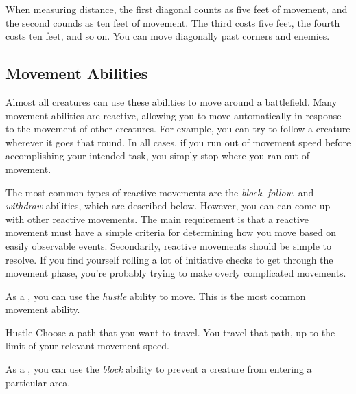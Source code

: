         \label{Diagonals} When measuring distance, the first diagonal counts as five feet of movement, and the second counds as ten feet of movement.
        The third costs five feet, the fourth costs ten feet, and so on.
        You can move diagonally past corners and enemies.

    \subsection{Movement Abilities}\label{Movement Abilities}

        Almost all creatures can use these abilities to move around a battlefield.
        Many movement abilities are reactive, allowing you to move automatically in response to the movement of other creatures.
        For example, you can try to follow a creature wherever it goes that round.
        In all cases, if you run out of movement speed before accomplishing your intended task, you simply stop where you ran out of movement.

        The most common types of reactive movements are the \textit{block}, \textit{follow}, and \textit{withdraw} abilities, which are described below.
        However, you can can come up with other reactive movements.
        The main requirement is that a reactive movement must have a simple criteria for determining how you move based on easily observable events.
        Secondarily, reactive movements should be simple to resolve.
        If you find yourself rolling a lot of initiative checks to get through the movement phase, you're probably trying to make overly complicated movements.

        \label{Hustle} As a , you can use the \textit{hustle} ability to move.
        This is the most common movement ability.

        \begin{activeability}{Hustle}
            \rankline
            Choose a path that you want to travel.
            You travel that path, up to the limit of your relevant movement speed.
        \end{activeability}

        \label{Block} As a , you can use the \textit{block} ability to prevent a creature from entering a particular area.

